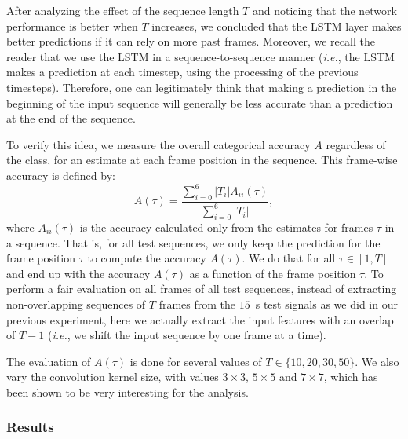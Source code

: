 After analyzing the effect of the sequence length $T$ and noticing that the network performance is better when $T$ increases, we concluded that the LSTM layer makes better predictions if it can rely on more past frames. Moreover, we recall the reader that we use the LSTM in a sequence-to-sequence manner (\emph{i.e.}, the LSTM makes a prediction at each timestep, using the processing of the previous timesteps). Therefore, one can legitimately think that making a prediction in the beginning of the input sequence will generally be less accurate than a prediction at the end of the sequence.

To verify this idea, we measure the overall categorical accuracy $A$ regardless of the class, for an estimate at each frame position in the sequence. This frame-wise accuracy is defined by:
\begin{equation}
    \label{eq:overallCountingCategoricalAccuracy}
    A(\tau) = \frac{\sum_{i=0}^6 \lvert T_i \rvert A_{ii}(\tau)}{\sum_{i=0}^6 \lvert T_i \rvert},
\end{equation}
where $A_{ii}(\tau)$ is the accuracy calculated only from the estimates for frames $\tau$ in a sequence. That is, for all test sequences, we only keep the prediction for the frame position $\tau$ to compute the accuracy $A(\tau)$. We do that for all $\tau \in [1, T]$ and end up with the accuracy $A(\tau)$ as a function of the frame position $\tau$. To perform a fair evaluation on all frames of all test sequences, instead of extracting non-overlapping sequences of $T$ frames from the $15$~s test signals as we did in our previous experiment, here we actually extract the input features with an overlap of $T-1$ (\emph{i.e.}, we shift the input sequence by one frame at a time).

The evaluation of $A(\tau)$ is done for several values of $T \in \{10, 20, 30, 50\}$. We also vary the convolution kernel size, with values $3 \times 3$, $5 \times 5$ and $7 \times 7$, which has been shown to be very interesting for the analysis.

\subsubsection{Results}

